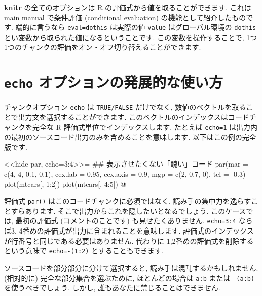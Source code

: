 \documentclass[
  lualatex,ja=standard,jafont=noto-otf]{bxjsreport}
\newenvironment{Shaded}{\begin{snugshade}}{\end{snugshade}}
\newcommand{\NormalTok}[1]{#1}
\begin{document}
\textbf{knitr} の全ての\href{$options}{オプション}は R
の評価式から値を取ることができます. これは main manual で条件評価
(conditional evaluation) の機能として紹介したものです. 端的に言うなら
\texttt{eval=dothis} は実際の値 \texttt{value} はグローバル環境の
\texttt{dothis} とい変数から取られた値になるということです.
この変数を操作することで,
1つ1つのチャンクの評価をオン・オフ切り替えることができます.

\hypertarget{echo-ux30aaux30d7ux30b7ux30e7ux30f3ux306eux767aux5c55ux7684ux306aux4f7fux3044ux65b9}{%
\section*{\texorpdfstring{\texttt{echo}
オプションの発展的な使い方}{echo オプションの発展的な使い方}}\label{echo-ux30aaux30d7ux30b7ux30e7ux30f3ux306eux767aux5c55ux7684ux306aux4f7fux3044ux65b9}}

チャンクオプション \texttt{echo} は \texttt{TRUE/FALSE} だけでなく,
数値のベクトルを取ることで出力文を選択することができます.
このベクトルのインデックスはコードチャンクを完全な R
評価式単位でインデックスします. たとえば \texttt{echo=1}
は出力内の最初のソースコード出力のみを含めることを意味します.
以下はこの例の完全版です.

\begin{Shaded}
\begin{Highlighting}[numbers=left,,]
\NormalTok{\textless{}\textless{}hide{-}par, echo=3:4\textgreater{}\textgreater{}=}
\NormalTok{\#\# 表示させたくない「醜い」コード}
\NormalTok{par(mar = c(4, 4, 0.1, 0.1), cex.lab = 0.95, cex.axis = 0.9,}
\NormalTok{    mgp = c(2, 0.7, 0), tcl = {-}0.3)}
\NormalTok{plot(mtcars[, 1:2])}
\NormalTok{plot(mtcars[, 4:5])}
\NormalTok{@}
\end{Highlighting}
\end{Shaded}

評価式 \texttt{par()} はこのコードチャンクに必須ではなく,
読み手の集中力を逸らすことすらあります.
そこで出力からこれを隠したいとなるでしょう. このケースでは, 最初の評価式
(コメントのことです) も見せたくありません. \texttt{echo=3:4} ならば3,
4番めの評価式が出力に含まれることを意味します.
評価式のインデックスが行番号と同じである必要はありません. 代わりに
1,2番めの評価式を削除するという意味で \texttt{echo=-(1:2)}
とすることもできます.

ソースコードを部分部分に分けて選択すると,
読み手は混乱するかもしれません. (相対的に) 完全な部分集合を選ぶために,
ほとんどの場合は \texttt{a:b} または \texttt{-(a:b)} を使うべきでしょう.
しかし, 誰もあなたに禁じることはできません.
\end{document}
